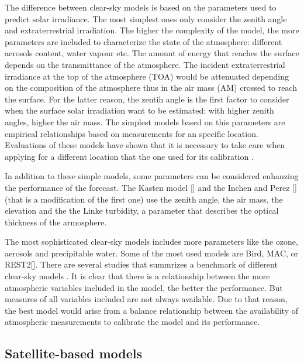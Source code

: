 The difference between clear-sky models is based on the parameters used to predict solar irradiance. The most simplest ones only consider the zenith angle and extraterrestrial irradiation. The higher the complexity of the model, the more parameters are included to characterize the state of the atmosphere: different aerosols content, water vapour etc. 
The amount of energy that reaches the surface depends on the transmittance of the atmosphere. The incident extraterrestrial irradiance at the top of the atmosphere (TOA) would be attenuated depending on the composition of the atmosphere thus in the air mass (AM) crossed to reach the surface. For the latter reason, the zentih angle is the first factor to consider when the surface solar irradiation want to be estimated: with higher zenith angles, higher the air mass. The simplest models based on this parameters are empirical relationships based on measurements for an specific location. Evaluations of these models have shown that it is necessary to take care when applying for a different location that the one used for its calibration \cite*{Badescu1997, Davies1989}.

In addition to these simple models, some parameters can be considered enhanzing the performance of the forecast. The Kasten model [] and the Inchen and Perez [] (that is a modification of the first one) use the zenith angle, the air mass, the elevation and the the Linke turbidity, a parameter that describes the optical thickness of the armosphere.

The most sophisticated clear-sky models includes more parameters like the ozone, aerosols and precipitable water. Some of the most used models are Bird, MAC, or REST2[]. There are several studies that summrizes a benchmark of different clear-sky models \cite*{Gueymard2013a,b}. It is clear that there is a relationship between the more atmospheric variables included in the model, the better the performance. But measures of all variables included are not always available. Due to that reason, the best model would arise from a balance relationship between the availability of atmospheric measurements to calibrate the model and its performance. 
 

\subsection{Satellite-based models}

